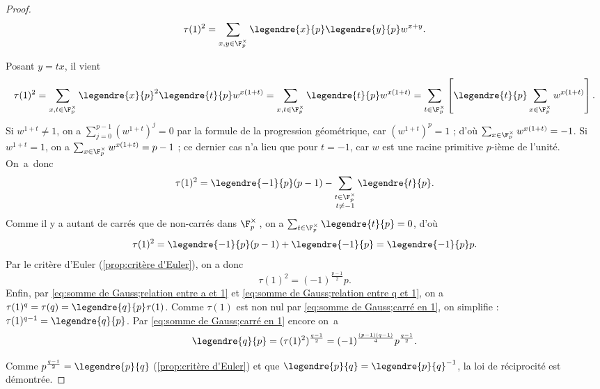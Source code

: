 \documentclass[11pt, useosf,
  title in boldface,
  theorem in new line,
  theorem numbering = section,
  number theorems separately,
]{simplivre}
\begin{document}
\begin{proof}
        \vspace{-.2\baselineskip}%
        \[
            \tau(1)^2 = \sum_{x,y \in \F_p^\times} \legendre{x}{p} \legendre{y}{p} w^{x+y}.
        \]
        \vspace{-1.2\baselineskip}\par\noindent%
        Posant \( y = tx \), il vient
        \vspace{-.2\baselineskip}%
        \[
            \tau(1)^2 = \sum_{x,t \in \F_p^\times} \legendre{x}{p}^2 \legendre{t}{p} w^{x(1+t)} = \sum_{x,t \in \F_p^\times} \legendre{t}{p} w^{x(1+t)} = \sum_{t \in \F_p^\times} \left[ \legendre{t}{p} \sum_{x \in \F_p^\times} w^{x(1+t)} \right].
        \]
        Si \( w^{1+t} \neq 1 \), on a \( \sum_{j=0}^{p-1} (w^{1+t})^j = 0 \) par la formule de la progression géométrique, car \( (w^{1+t})^p = 1 \) ; d'où \( \sum_{x \in \F_p^\times} w^{x(1+t)} = -1 \). Si \( w^{1+t} = 1 \), on a \( \sum_{x \in \F_p^\times} w^{x(1+t)} = p-1 \) ; ce dernier cas n'a lieu que pour \( t = -1 \), car \( w \) est une racine primitive \( p \)‑ième de l'unité. On~a~donc
        {\[\setlength{\abovedisplayskip}{.5\baselineskip}%
        \setlength{\belowdisplayskip}{.5\baselineskip}%
            \tau(1)^2 = \legendre{-1}{p}(p-1) - \sum_{\substack{t \in \F_p^\times \\ t \neq -1}} \legendre{t}{p}.
        \]}%
        Comme il y a autant de carrés que de non-carrés dans \( \F_p^\times \)\,, on a \( \sum_{t \in \F_p^\times} \legendre{t}{p} = 0 \), d'où
        \vspace{-.25\baselineskip}%
        \[
            \tau(1)^2 = \legendre{-1}{p}(p-1) + \legendre{-1}{p} = \legendre{-1}{p} p.
        \]
        Par le critère d'Euler (\cref{prop:critère d'Euler}), on a donc
        \vspace{-.25\baselineskip}%
        \begin{equation}\label{eq:somme de Gauss;carré en 1}
            \tau(1)^2 = (-1)^{\frac{p-1}{2}} p.
        \end{equation}
        Enfin, par \eqref{eq:somme de Gauss;relation entre a et 1} et \eqref{eq:somme de Gauss;relation entre q et 1}, on a \( \tau(1)^q = \tau(q) = \legendre{q}{p} \tau(1) \). Comme \( \tau(1) \) est non nul par \eqref{eq:somme de Gauss;carré en 1}, on simplifie : \( \tau(1)^{q-1} = \legendre{q}{p} \). Par \eqref{eq:somme de Gauss;carré en 1} encore on~a
        \vspace{-.3\baselineskip}%
        \[
            \legendre{q}{p} = (\tau(1)^2)^{\frac{q-1}{2}} = (-1)^{\frac{(p-1)(q-1)}{4}} p^{\frac{q-1}{2}}.
        \]
        \vspace{-.7\baselineskip}\par\noindent%
        Comme \( p^{\frac{q-1}{2}} = \legendre{p}{q} \) (\cref{prop:critère d'Euler}) et que \( \legendre{p}{q} = \legendre{p}{q}^{-1} \), la loi de réciprocité est démontrée.
    \end{proof}
\end{document}
